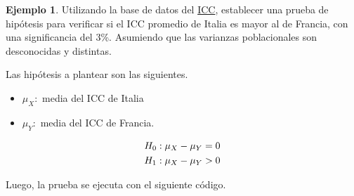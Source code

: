 \documentclass[
  11pt,
]{book}
\newenvironment{Shaded}{\begin{snugshade}}{\end{snugshade}}
\newcommand{\AttributeTok}[1]{\textcolor[rgb]{0.13,0.29,0.53}{#1}}
\newcommand{\CommentTok}[1]{\textcolor[rgb]{0.56,0.35,0.01}{\textit{#1}}}
\newcommand{\DecValTok}[1]{\textcolor[rgb]{0.00,0.00,0.81}{#1}}
\newcommand{\FloatTok}[1]{\textcolor[rgb]{0.00,0.00,0.81}{#1}}
\newcommand{\FunctionTok}[1]{\textcolor[rgb]{0.13,0.29,0.53}{\textbf{#1}}}
\newcommand{\NormalTok}[1]{#1}
\newcommand{\OtherTok}[1]{\textcolor[rgb]{0.56,0.35,0.01}{#1}}
\newcommand{\SpecialCharTok}[1]{\textcolor[rgb]{0.81,0.36,0.00}{\textbf{#1}}}
\newcommand{\StringTok}[1]{\textcolor[rgb]{0.31,0.60,0.02}{#1}}
\providecommand{\tightlist}{%
  \setlength{\itemsep}{0pt}\setlength{\parskip}{0pt}}
\theoremstyle{definition}
\theoremstyle{definition}
\newtheorem{example}{Ejemplo}[chapter]
\theoremstyle{definition}
\theoremstyle{definition}
\theoremstyle{remark}
\begin{document}
\begin{example}

Utilizando la base de datos del \hyperref[ICC]{ICC}, establecer una prueba de hipótesis para verificar si el ICC promedio de Italia es mayor al de Francia, con una significancia del 3\%. Asumiendo que las varianzas poblacionales son desconocidas y distintas.

Las hipótesis a plantear son las siguientes.

\begin{itemize}
\tightlist
\item
  \(\mu_X:\) media del ICC de Italia
\item
  \(\mu_Y:\) media del ICC de Francia.
\end{itemize}

\begin{equation}
\notag
  \begin{split}
    H_0&: \mu_{X} - \mu_{Y} = 0\\
    H_1&: \mu_{X} - \mu_{Y} > 0\\
  \end{split}
\end{equation}

Luego, la prueba se ejecuta con el siguiente código.

\begin{Shaded}
\end{Shaded}


\end{example}
\end{document}
